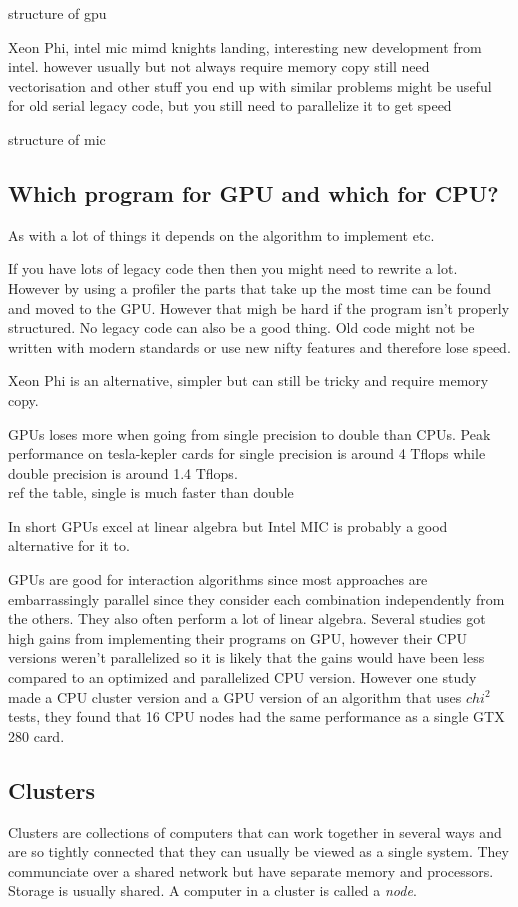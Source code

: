 \documentclass[10pt,a4paper]{report}
\begin{document}
structure of gpu

Xeon Phi, intel mic
mimd
knights landing, interesting new development from intel.
however usually but not always require memory copy
still need vectorisation and other stuff
you end up with similar problems
might be useful for old serial legacy code, but you still need to parallelize it to get speed

structure of mic

\subsection{Which program for GPU and which for CPU?}
\label{gpu_gwas}
As with a lot of things it depends on the algorithm to implement etc.

If you have lots of legacy code then then you might need to rewrite a lot. However by using a profiler the parts that take up the most time can be found and moved to the GPU. However that migh be hard if the program isn't properly structured. No legacy code can also be a good thing. Old code might not be written with modern standards or use new nifty features and therefore lose speed.

Xeon Phi is an alternative, simpler but can still be tricky and require memory copy.

GPUs loses more when going from single precision to double than CPUs. Peak performance on tesla-kepler cards for single precision is around 4 Tflops while double precision is around 1.4 Tflops. \cite{nvtesla}\\ ref the table, single is much faster than double

In short GPUs excel at linear algebra but Intel MIC is probably a good alternative for it to.

GPUs are good for interaction algorithms since most approaches are embarrassingly parallel since they consider each combination independently from the others. They also often perform a lot of linear algebra. Several studies got high gains from implementing their programs on GPU, however their CPU versions weren't parallelized so it is likely that the gains would have been less compared to an optimized and parallelized CPU version.\cite{gwis,gboost,gmdr_gpu,cuda_lr,genie_2012,plink_gpu} However one study made a CPU cluster version and a GPU version of an algorithm that uses $chi^2$ tests, they found that 16 CPU nodes had the same performance as a single GTX 280 card\cite{jiang_accelerating}.

\subsection{Clusters}
Clusters are collections of computers that can work together in several ways and are so tightly connected that they can usually be viewed as a single system. They communciate over a shared network but have separate memory and processors. Storage is usually shared. A computer in a cluster is called a \emph{node}. \cite{intro_hpc, kirk2012programming}
\end{document}
